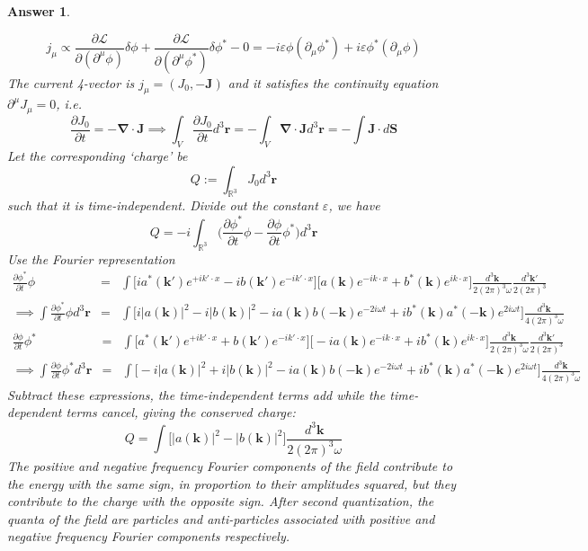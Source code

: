 \documentclass[a4paper]{article}
\newtheorem{ans}{Answer}[section]
\theoremstyle{new}
\begin{document}
\begin{ans}
\begin{enumerate}[label=(\alph*)]
$$j_\mu\propto\frac{\partial\mathcal{L}}{\partial(\partial^\mu\phi)}\delta\phi+\frac{\partial\mathcal{L}}{\partial(\partial^\mu\phi^*)}\delta\phi^*-0=-i\varepsilon\phi(\partial_\mu\phi^*)+i\varepsilon\phi^*(\partial_\mu\phi)$$
The current 4-vector is $j_\mu=(J_0,-\mathbf{J})$ and it satisfies the continuity equation $\partial^\mu J_\mu=0$, i.e.
$$\frac{\partial J_0}{\partial t}=-\boldsymbol{\nabla}\cdot\mathbf{J}\implies\int_V\frac{\partial J_0}{\partial t}d^3\mathbf{r}=-\int_V\boldsymbol{\nabla}\cdot\mathbf{J}d^3\mathbf{r}=-\int\mathbf{J}\cdot d\mathbf{S}$$
Let the corresponding `charge' be
$$Q:=\int_{\mathbb{R}^3}J_0d^3\mathbf{r}$$
such that it is time-independent. Divide out the constant $\varepsilon$, we have
$$Q=-i\int_{\mathbb{R}^3}\bigg(\frac{\partial\phi^*}{\partial t}\phi-\frac{\partial\phi}{\partial t}\phi^*\bigg)d^3\mathbf{r}$$
Use the Fourier representation
\begin{eqnarray}
\frac{\partial\phi^*}{\partial t}\phi&=&\int\bigg[ia^*(\mathbf{k'})e^{+ik'\cdot x}-ib(\mathbf{k'})e^{-ik'\cdot x}\bigg]\bigg[a(\mathbf{k})e^{-ik\cdot x}+b^*(\mathbf{k})e^{ik\cdot x}\bigg]\frac{d^3\mathbf{k}}{2(2\pi)^3\omega}\frac{d^3\mathbf{k'}}{2(2\pi)^3}\nonumber\\\implies
\int\frac{\partial\phi^*}{\partial t}\phi d^3\mathbf{r}&=&\int\bigg[i|a(\mathbf{k})|^2-i|b(\mathbf{k})|^2-ia(\mathbf{k})b(-\mathbf{k})e^{-2i\omega t}+ib^*(\mathbf{k})a^*(-\mathbf{k})e^{2i\omega t}\bigg]\frac{d^3\mathbf{k}}{4(2\pi)^3\omega}\nonumber
\end{eqnarray}
\begin{eqnarray}
\frac{\partial\phi}{\partial t}\phi^*&=&\int\bigg[a^*(\mathbf{k'})e^{+ik'\cdot x}+b(\mathbf{k'})e^{-ik'\cdot x}\bigg]\bigg[-ia(\mathbf{k})e^{-ik\cdot x}+ib^*(\mathbf{k})e^{ik\cdot x}\bigg]\frac{d^3\mathbf{k}}{2(2\pi)^3\omega}\frac{d^3\mathbf{k'}}{2(2\pi)^3}\nonumber\\\implies
\int\frac{\partial\phi}{\partial t}\phi^* d^3\mathbf{r}&=&\int\bigg[-i|a(\mathbf{k})|^2+i|b(\mathbf{k})|^2-ia(\mathbf{k})b(-\mathbf{k})e^{-2i\omega t}+ib^*(\mathbf{k})a^*(-\mathbf{k})e^{2i\omega t}\bigg]\frac{d^3\mathbf{k}}{4(2\pi)^3\omega}\nonumber
\end{eqnarray}
Subtract these expressions, the time-independent terms add while the time-dependent terms cancel, giving the conserved charge:
$$Q=\int\bigg[|a(\mathbf{k})|^2-|b(\mathbf{k})|^2\bigg]\frac{d^3\mathbf{k}}{2(2\pi)^3\omega}$$
The positive and negative frequency Fourier components of the field contribute to the energy with the same sign, in proportion to their amplitudes squared, but they contribute to the charge with the opposite sign. After second quantization, the quanta of the field are particles and anti-particles associated with positive and negative frequency Fourier components respectively.
\end{enumerate}
\end{ans}
\end{document}
